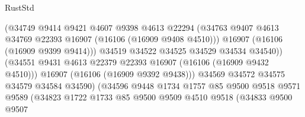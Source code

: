 \begin{lexlean}{RustStd}
\begin{coremodule}
                                        (@34749
                                          @9414
                                          @9421
                                          @4607
                                          @9398
                                          @4613
                                          @22294
                                          (@34763
                                            @9407
                                            @4613
                                            @34769
                                            @22393
                                            @16907
                                            (@16106 (@16909 @9408 @4510)))
                                          @16907
                                          (@16106 (@16909 @9399 @9414)))
                                        @34519
                                        @34522
                                        @34525
                                        @34529
                                        @34534
                                        @34540))
                                    (@34551
                                      @9431
                                      @4613
                                      @22379
                                      @22393
                                      @16907
                                      (@16106 (@16909 @9432 @4510)))
                                    @16907
                                    (@16106 (@16909 @9392 @9438)))
                                  @34569
                                  @34572
                                  @34575
                                  @34579
                                  @34584
                                  @34590)
                                (@34596
                                  @9448
                                  @1734
                                  @1757
                                  @85
                                  @9500
                                  @9518
                                  @9571
                                  @9589
                                  (@34823
                                    @1722
                                    @1733
                                    @85
                                    @9500
                                    @9509
                                    @4510
                                    @9518
                                    (@34833
                                      @9500
                                      @9507

\end{coremodule}
\end{lexlean}
